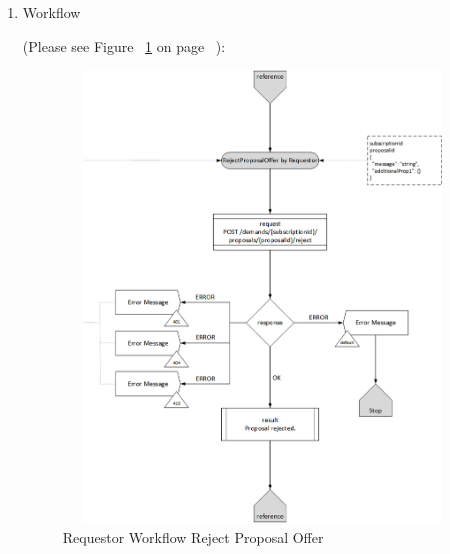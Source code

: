 \begin{enumerate}
\item Workflow

(Please see Figure ~\ref{fig:RPO} on page ~\pageref{fig:RPO}):

\begin{figure}[H]
    \centering
    \includegraphics[width=12cm,height=12cm,angle=0]{./diag/Workflow/Market/RejectProposalOffer-R-Workflow.png}
    \caption{Requestor Workflow Reject Proposal Offer }
	\label{fig:RPO}
\end{figure}


\end{enumerate}

\newpage


